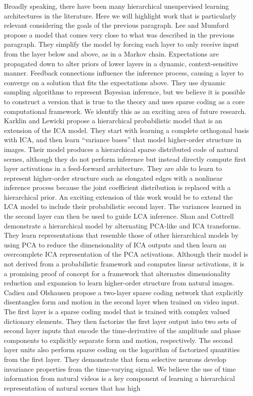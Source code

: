 Broadly speaking, there have been many hierarchical unsupervised learning architectures in the literature. Here we will highlight work that is particularly relevant considering the goals of the previous paragraph. Lee and Mumford \citeyearpar{lee2003hierarchical} propose a model that comes very close to what was described in the previous paragraph. They simplify the model by forcing each layer to only receive input from the layer below and above, as in a Markov chain. Expectations are propagated down to alter priors of lower layers in a dynamic, context-sensitive manner. Feedback connections influence the inference process, causing a layer to converge on a solution that fits the expectations above. They use dynamic sampling algorithms to represent Bayesian inference, but we believe it is possible to construct a version that is true to the theory and uses sparse coding as a core computational framework. We identify this as an exciting area of future research. Karklin and Lewicki \citeyearpar{karklin2003learning} propose a hierarchical probabilistic model that is an extension of the ICA model. They start with learning a complete orthogonal basis with ICA, and then learn ``variance bases'' that model higher-order structure in images. Their model produces a hierarchical sparse distributed code of natural scenes, although they do not perform inference but instead directly compute first layer activations in a feed-forward architecture. They are able to learn to represent higher-order structure such as elongated edges with a nonlinear inference process because the joint coefficient distribution is replaced with a hierarchical prior. An exciting extension of this work would be to extend the LCA model to include their probabilistic second layer. The variances learned in the second layer can then be used to guide LCA inference. Shan and Cottrell \citeyearpar{shan2013efficient}  demonstrate a hierarchical model by alternating PCA-like and ICA transforms. They learn representations that resemble those of other hierarchical models by using PCA to reduce the dimensionality of ICA outputs and then learn an overcomplete ICA \parencite{le2011ica} representation of the PCA activations. Although their model is not derived from a probabilistic framework and computes linear activations, it is a promising proof of concept for a framework that alternates dimensionality reduction and expansion to learn higher-order structure from natural images. Cadieu and Olshausen \citeyearpar{cadieu2008learning} propose a two-layer sparse coding network that explicitly disentangles form and motion in the second layer when trained on video input. The first layer is a sparse coding model that is trained with complex valued dictionary elements. They then factorize the first layer output into two sets of second layer inputs that encode the time-derivative of the amplitude and phase components to explicitly separate form and motion, respectively. The second layer units also perform sparse coding on the logarithm of factorized quantities from the first layer. They demonstrate that form selective neurons develop invariance properties from the time-varying signal. We believe the use of time information from natural videos is a key component of learning a hierarchical representation of natural scenes that has high 